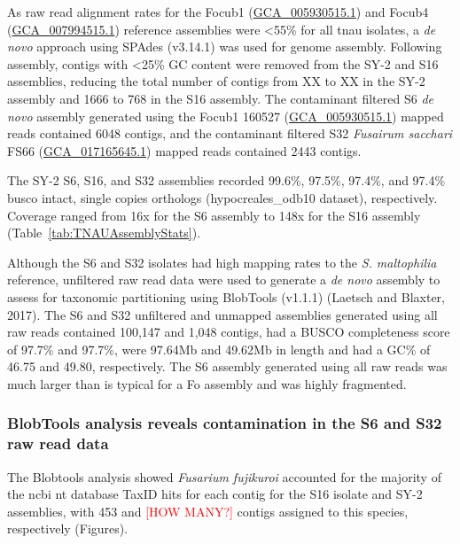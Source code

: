 As raw read alignment rates for the \ac{Focub1} (\href{https://www.ncbi.nlm.nih.gov/datasets/genome/GCA_005930515.1/}{GCA\_005930515.1}) and \ac{Focub4} (\href{https://www.ncbi.nlm.nih.gov/datasets/genome/GCA_007994515.1/}{GCA\_007994515.1}) reference assemblies were <55\% for all \ac{tnau} isolates, a \textit{de novo} approach using SPAdes (v3.14.1) was used for genome assembly. Following assembly, contigs with \textless 25\% GC content were removed from the SY-2 and S16 assemblies, reducing the total number of contigs from XX to XX in the SY-2 assembly and 1666 to 768 in the S16 assembly. The contaminant filtered S6 \textit{de novo} assembly generated using the \ac{Focub1} 160527 (\href{https://www.ncbi.nlm.nih.gov/datasets/genome/GCA_005930515.1/}{GCA\_005930515.1}) mapped reads contained 6048 contigs, and the contaminant filtered S32 \textit{Fusairum sacchari} FS66 (\href{https://www.ncbi.nlm.nih.gov/datasets/genome/GCA_017165645.1/}{GCA\_017165645.1}) mapped reads contained 2443 contigs. 

The SY-2 S6, S16, and S32 assemblies recorded 99.6\%, 97.5\%, 97.4\%, and 97.4\% \ac{busco} intact, single copies orthologs (hypocreales\_odb10 dataset), respectively. Coverage ranged from 16x for the S6 assembly to 148x for the S16 assembly (Table~\ref{tab:TNAUAssemblyStats}).

\bigskip

\bigskip

Although the S6 and S32 isolates had high mapping rates to the \textit{S. maltophilia} reference, unfiltered raw read data were used to generate a \textit{de novo} assembly to assess for taxonomic partitioning using BlobTools (v1.1.1) (Laetsch and Blaxter, 2017). The S6 and S32 unfiltered and unmapped assemblies generated using all raw reads contained 100,147 and 1,048 contigs, had a BUSCO completeness score of 97.7\% and 97.7\%, were 97.64Mb and 49.62Mb in length and had a GC\% of 46.75 and 49.80, respectively. The S6 assembly generated using all raw reads was much larger than is typical for a \ac{Fo} assembly and was highly fragmented. 

\subsubsection{BlobTools analysis reveals contamination in the S6 and S32 raw read data}

The Blobtools analysis showed \textit{Fusarium fujikuroi} accounted for the majority of the \ac{ncbi} nt database TaxID hits for each contig for the S16 isolate and SY-2 assemblies, with 453 and \textcolor{red}{[HOW MANY?]} contigs assigned to this species, respectively (Figures). 

